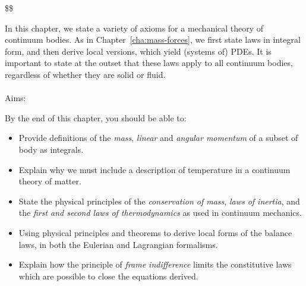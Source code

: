 \documentclass[
  letterpaper,
  DIV=11,
  numbers=noendperiod]{scrreprt}
\makeatletter
\let\oldparagraph\paragraph
\renewcommand{\paragraph}{
    \@ifstar
      \xxxParagraphStar
      \xxxParagraphNoStar
  }
\newcommand{\xxxParagraphStar}[1]{\oldparagraph*{#1}\mbox{}}
\newcommand{\xxxParagraphNoStar}[1]{\oldparagraph{#1}\mbox{}}
\theoremstyle{plain}
\theoremstyle{remark}
\makeatother
\begin{document}
\newcommand{\bftau}{{\boldsymbol{\tau}}}
\newcommand{\bfnu}{{\boldsymbol{\nu}}}
\newcommand{\bfpsi}{{\boldsymbol{\psi}}}
\newcommand{\bfphi}{{\boldsymbol{\varphi}}}
\newcommand{\bfSigma}{{\boldsymbol{\Sigma}}}
\newcommand{\calI}{{\mathcal{I}}}
\newcommand{\calN}{{\mathcal{N}}}
\newcommand{\calV}{{\mathcal{V}}}
\newcommand{\bbE}{{\mathbb{E}}}
\newcommand{\bbR}{{\mathbb{R}}}
\newcommand{\bbC}{{\mathbb{C}}}
\newcommand{\bsfC}{{\mathsf{C}}}
\newcommand{\bsfD}{{\mathsf{D}}}
\newcommand{\bsfI}{{\mathsf{I}}}
\newcommand{\bsfO}{{\mathsf{O}}}
\newcommand{\tr}{{\operatorname{tr}}}
\newcommand{\sym}{{\operatorname{sym}}}
\newcommand{\skw}{{\operatorname{skew}}}
\newcommand{\vc}{{\operatorname{vec}}}
\newcommand{\ten}{{\operatorname{ten}}}
\newcommand{\cof}{{\operatorname{cof}}}
\newcommand{\mass}{{\operatorname{mass}}}
\newcommand{\vol}{{\operatorname{vol}}}
\newcommand{\area}{{\operatorname{area}}}
\newcommand{\com}{{\operatorname{com}}}
\newcommand{\cov}{{\operatorname{cov}}}
\newcommand{\e}{{\mathrm{e}}}
\newcommand{\D}{{\mathrm{D}}}
\newcommand{\d}{{\mathrm{d}}}
\newcommand{\dt}{{\d t}}
\newcommand{\Dt}{{\D t}}
\newcommand{\bigO}{{O}}
\newcommand{\litO}{{o}}
\newcommand{\dVx}{{\,\d V_{\bfx}}}
\newcommand{\dAx}{{\,\d A_{\bfx}}}
\newcommand{\dVy}{{\,\d V_{\bfy}}}
\newcommand{\dAy}{{\,\d A_{\bfy}}}
\newcommand{\ds}{{\,\d s}}

\$\$

In this chapter, we state a variety of axioms for a mechanical theory of
continuum bodies. As in
Chapter~\hyperref[cha:mass-forces]{{[}cha:mass-forces{]}}, we first
state laws in integral form, and then derive local versions, which yield
(systems of) PDEs. It is important to state at the outset that these
laws apply to all continuum bodies, regardless of whether they are solid
or fluid.

\paragraph{Aims:}\label{aims}

By the end of this chapter, you should be able to:

\begin{itemize}
\item
  Provide definitions of the \emph{mass}, \emph{linear} and
  \emph{angular momentum} of a subset of body as integrals.
\item
  Explain why we must include a description of temperature in a
  continuum theory of matter.
\item
  State the physical principles of the \emph{conservation of mass},
  \emph{laws of inertia}, and the \emph{first and second laws of
  thermodynamics} as used in continuum mechanics.
\item
  Using physical principles and theorems to derive local forms of the
  balance laws, in both the Eulerian and Lagrangian formalisms.
\item
  Explain how the principle of \emph{frame indifference} limits the
  constitutive laws which are possible to close the equations derived.
\end{itemize}
\end{document}
